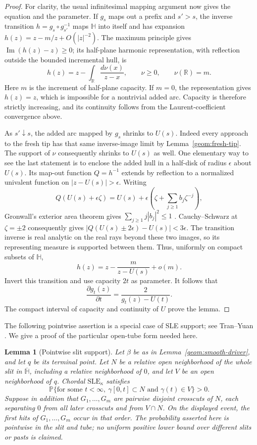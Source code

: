 \documentclass[11pt]{article}
\newtheorem{lemma}[theorem]{Lemma}
\theoremstyle{definition}
\theoremstyle{remark}
\numberwithin{equation}{section}
\begin{document}
\begin{proof}
For clarity, the usual infinitesimal mapping argument now gives the
equation and the parameter.  If $g_s$ maps out a prefix and $s'>s$,
the inverse transition $h=g_s\circ g_{s'}^{-1}$ maps $\mathbb H$
into itself and has expansion $h(z)=z-m/z+O(|z|^{-2})$.  The
maximum principle gives $\operatorname{Im}(h(z)-z)\ge0$; its
half-plane harmonic representation, with reflection outside the
bounded incremental hull, is
\[
 h(z)=z-\int_{\mathbb R}\frac{d\nu(x)}{z-x},
 \qquad \nu\ge0,\qquad \nu(\mathbb R)=m.
\]
Here $m$ is the increment of half-plane capacity.  If $m=0$, the
representation gives $h(z)=z$, which is impossible for a nontrivial
added arc.  Capacity is therefore strictly increasing, and its
continuity follows from the Laurent-coefficient convergence above.

As $s'\downarrow s$, the added arc mapped by $g_s$ shrinks to $U(s)$.
Indeed every approach to the fresh tip has that same inverse-image
limit by Lemma~\ref{geom:fresh-tip}.  The support of $\nu$ consequently
shrinks to $U(s)$ as well.  One elementary way to see the last statement
is to enclose the added hull in a half-disk of radius $\epsilon$
about $U(s)$.  Its map-out function $Q=h^{-1}$ extends by reflection
to a normalized univalent function on $|z-U(s)|>\epsilon$.
Writing
\[
 Q(U(s)+\epsilon\zeta)
   =U(s)+\epsilon\left(\zeta+
                         \sum_{j\ge1}b_j\zeta^{-j}\right),
\]
Gronwall's exterior area theorem gives $\sum_{j\ge1}j|b_j|^2\le1$
\cite[Theorem~3.2.1 and Corollary~3.2.2, pp.~37--38]{beliaev2015}.
Cauchy--Schwarz at $\zeta=\pm2$ consequently gives
$|Q(U(s)\pm2\epsilon)-U(s)|<3\epsilon$.
The transition inverse is real analytic on the real rays beyond
these two images, so its representing measure is supported between
them.
Thus, uniformly on compact subsets of $\mathbb H$,
\[
 h(z)=z-\frac{m}{z-U(s)}+o(m).
\]
Invert this transition and use capacity $2t$ as parameter.  It follows
that
\[
 \frac{\partial g_t(z)}{\partial t}
       =\frac{2}{g_t(z)-U(t)}.
\]
The compact interval of capacity and continuity of $U$ prove the lemma.
\end{proof}

The following pointwise assertion is a special case of SLE support;
see Tran--Yuan \cite[Theorem~1.1 and Corollary~1.2]{tranyuan2020}.
We give a proof of the particular open-tube form needed here.

\begin{lemma}[Pointwise slit support]
\label{geom:slit-support}
Let $\beta$ be as in Lemma~\ref{geom:smooth-driver}, and let $q$ be its
terminal point.  Let $N$ be a relative open neighborhood of the whole
slit in $\overline{\mathbb H}$, including a relative neighborhood of
$0$, and let $V$ be an open neighborhood of $q$.  Chordal
$\mathrm{SLE}_{\kappa}$ satisfies
\[
 \mathbb P\{\text{for some }t<\infty,
       \ \gamma[0,t]\subset N\text{ and }\gamma(t)\in V\}>0.
\]
Suppose in addition that $G_1,\ldots,G_m$ are pairwise disjoint crosscuts
of $N$, each separating $0$ from all later crosscuts and from $V\cap N$.
On the displayed
event, the first hits of $G_1,\ldots,G_m$ occur in that order.
The probability asserted here is pointwise in the slit and tube; no
uniform positive lower bound over different slits or pasts is claimed.
\end{lemma}
\end{document}
